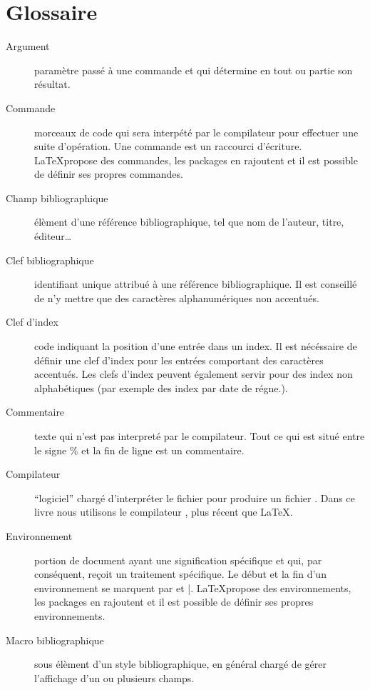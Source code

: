 \chapter{Glossaire}


\begin{description}
\item[Argument] paramètre passé à une commande et qui détermine en tout ou partie son résultat.
\item[Commande] morceaux de code qui sera interpété par le compilateur pour effectuer une suite d'opération. Une commande est un raccourci d'écriture. \LaTeX propose des commandes, les packages en rajoutent et il est possible de définir ses propres commandes.

\item[Champ bibliographique]élèment d'une référence bibliographique, tel que nom de l'auteur, titre, éditeur…

\item[Clef bibliographique]identifiant unique attribué à une référence bibliographique. Il est conseillé de n'y mettre que des caractères alphanumériques non accentués.

\item[Clef d'index] code indiquant la position d'une entrée dans un index. Il est nécéssaire de définir une clef d'index pour les entrées comportant des caractères accentués. Les clefs d'index peuvent également servir pour des index non alphabétiques (par exemple des index par date de régne.).
\item[Commentaire] texte qui n'est pas interpreté par le compilateur. Tout ce qui est situé entre le signe \% et la fin de ligne est un commentaire.

\item[Compilateur]\enquote{logiciel} chargé d'interpréter le fichier  pour produire un fichier . Dans ce livre nous utilisons le compilateur \XeLaTeX, plus récent que \LaTeX.

\item[Environnement]portion de document ayant une signification spécifique et qui, par conséquent, reçoit un traitement spécifique. Le début et la fin d'un environnement se marquent par  et |. \LaTeX propose des environnements, les packages en rajoutent et il est possible de définir ses propres environnements.

\item[Macro bibliographique]sous élèment d'un style bibliographique, en général chargé de gérer l'affichage d'un ou plusieurs champs.


\end{description}
